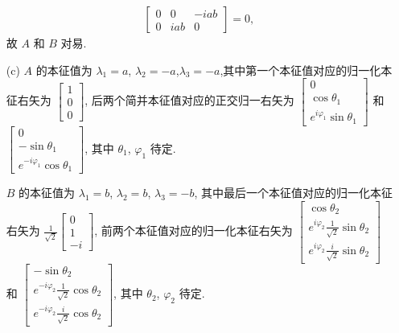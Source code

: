 \documentclass{assignment}
\begin{document}
\begin{sol}
\begin{itemize}
\begin{align}
\begin{bmatrix}
                0&0&-iab\\
                0&iab&0
            \end{bmatrix}=0,
        \end{align}
        故 $A$ 和 $B$ 对易.
        \item[(c)] $A$ 的本征值为 $\lambda_1=a$, $\lambda_2=-a$,$\lambda_3=-a$,其中第一个本征值对应的归一化本征右矢为 $\begin{bmatrix}
            1\\
            0\\
            0
        \end{bmatrix}$, 后两个简并本征值对应的正交归一右矢为 $\begin{bmatrix}
            0\\
            \cos\theta_1\\
            e^{i\varphi_1}\sin\theta_1
        \end{bmatrix}$ 和 $\begin{bmatrix}
            0\\
            -\sin\theta_1\\
            e^{-i\varphi_1}\cos\theta_1
        \end{bmatrix}$, 其中 $\theta_1$, $\varphi_1$ 待定.

        $B$ 的本征值为 $\lambda_1=b$, $\lambda_2=b$, $\lambda_3=-b$, 其中最后一个本征值对应的归一化本征右矢为 $\frac{1}{\sqrt{2}}\begin{bmatrix}
            0\\
            1\\
            -i
        \end{bmatrix}$, 前两个本征值对应的归一化本征右矢为 $\begin{bmatrix}
            \cos\theta_2\\
            e^{i\varphi_2}\frac{1}{\sqrt{2}}\sin\theta_2\\
            e^{i\varphi_2}\frac{i}{\sqrt{2}}\sin\theta_2
        \end{bmatrix}$ 和 $\begin{bmatrix}
            -\sin\theta_2\\
            e^{-i\varphi_2}\frac{1}{\sqrt{2}}\cos\theta_2\\
            e^{-i\varphi_2}\frac{i}{\sqrt{2}}\cos\theta_2
        \end{bmatrix}$, 其中 $\theta_2$, $\varphi_2$ 待定.


\end{itemize}
\end{sol}
\end{document}
